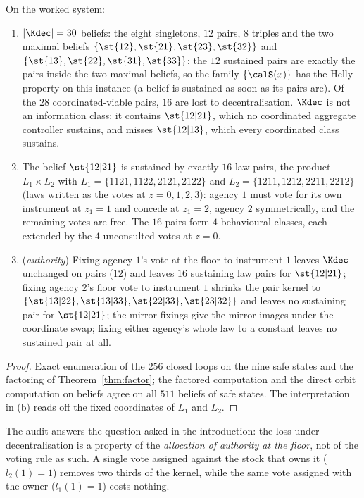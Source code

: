 \begin{proposition}\label{prop:deccensus}
On the worked system:
\begin{enumerate}[label=(\alph*),leftmargin=2em,itemsep=1pt]
\item $|\Kdec|=30$ beliefs: the eight singletons, $12$ pairs, $8$ triples and the two maximal beliefs $\{\st{12},\st{21},\st{23},\st{32}\}$ and $\{\st{13},\st{22},\st{31},\st{33}\}$; the $12$ sustained pairs are exactly the pairs inside the two maximal beliefs, so the family $\{\calS(x)\}$ has the Helly property on this instance (a belief is sustained as soon as its pairs are). Of the $28$ coordinated-viable pairs, $16$ are lost to decentralisation. $\Kdec$ is not an information class: it contains $\st{12|21}$, which no coordinated aggregate controller sustains, and misses $\st{12|13}$, which every coordinated class sustains.
\item The belief $\st{12|21}$ is sustained by exactly $16$ law pairs, the product $L_1\times L_2$ with $L_1=\{1121,1122,2121,2122\}$ and $L_2=\{1211,1212,2211,2212\}$ (laws written as the votes at $z=0,1,2,3$): agency $1$ must vote for its own instrument at $z_1=1$ and concede at $z_1=2$, agency $2$ symmetrically, and the remaining votes are free. The $16$ pairs form $4$ behavioural classes, each extended by the $4$ unconsulted votes at $z=0$.
\item (\emph{authority}) Fixing agency $1$'s vote at the floor to instrument $1$ leaves $\Kdec$ unchanged on pairs ($12$) and leaves $16$ sustaining law pairs for $\st{12|21}$; fixing agency $2$'s floor vote to instrument $1$ shrinks the pair kernel to $\{\st{13|22},\st{13|33},\st{22|33},\st{23|32}\}$ and leaves no sustaining pair for $\st{12|21}$; the mirror fixings give the mirror images under the coordinate swap; fixing either agency's whole law to a constant leaves no sustained pair at all.
\end{enumerate}
\end{proposition}

\begin{proof}
Exact enumeration of the $256$ closed loops on the nine safe states and the factoring of Theorem~\ref{thm:factor}; the factored computation and the direct orbit computation on beliefs agree on all $511$ beliefs of safe states. The interpretation in (b) reads off the fixed coordinates of $L_1$ and $L_2$.
\end{proof}

The audit answers the question asked in the introduction: the loss under decentralisation is a property of the \emph{allocation of authority at the floor}, not of the voting rule as such. A single vote assigned against the stock that owns it ($l_2(1)=1$) removes two thirds of the kernel, while the same vote assigned with the owner ($l_1(1)=1$) costs nothing.
